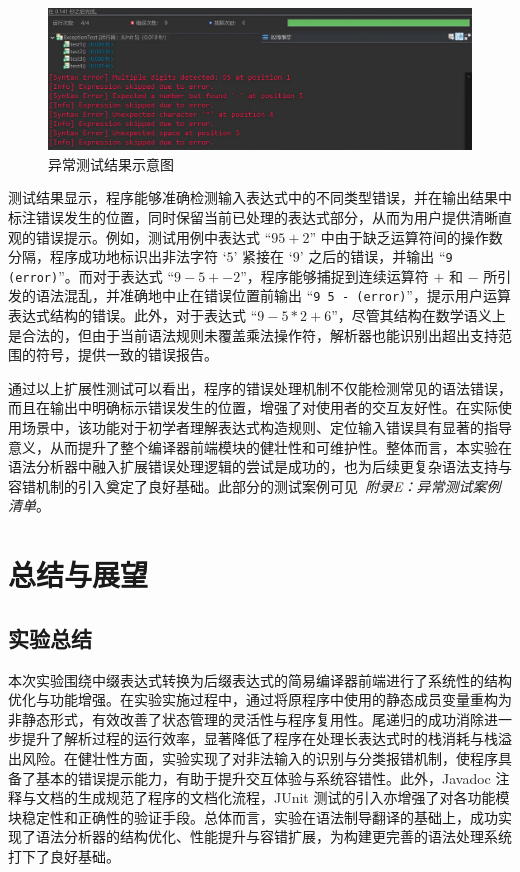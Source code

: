 \documentclass[a4paper, twoside, utf8]{ctexart}
\begin{document}
    \begin{figure}[htbp]
        \centering
        \includegraphics[width=0.8\linewidth]{figure/ExceptionTest.png}
        \caption{异常测试结果示意图}
    \end{figure}

    测试结果显示，程序能够准确检测输入表达式中的不同类型错误，并在输出结果中标注错误发生的位置，同时保留当前已处理的表达式部分，从而为用户提供清晰直观的错误提示。例如，测试用例中表达式 “$95+2$” 中由于缺乏运算符间的操作数分隔，程序成功地标识出非法字符 ‘$5$’ 紧接在 ‘$9$’ 之后的错误，并输出 “\verb|9 (error)|”。而对于表达式 “$9-5+-2$”，程序能够捕捉到连续运算符 $+$ 和 $-$ 所引发的语法混乱，并准确地中止在错误位置前输出 “\verb|9 5 - (error)|”，提示用户运算表达式结构的错误。此外，对于表达式 “$9-5*2+6$”，尽管其结构在数学语义上是合法的，但由于当前语法规则未覆盖乘法操作符，解析器也能识别出超出支持范围的符号，提供一致的错误报告。
    
    通过以上扩展性测试可以看出，程序的错误处理机制不仅能检测常见的语法错误，而且在输出中明确标示错误发生的位置，增强了对使用者的交互友好性。在实际使用场景中，该功能对于初学者理解表达式构造规则、定位输入错误具有显著的指导意义，从而提升了整个编译器前端模块的健壮性和可维护性。整体而言，本实验在语法分析器中融入扩展错误处理逻辑的尝试是成功的，也为后续更复杂语法支持与容错机制的引入奠定了良好基础。此部分的测试案例可见\ \textit{附录E：异常测试案例清单}。

    \section{总结与展望}

    \subsection{实验总结}

    本次实验围绕中缀表达式转换为后缀表达式的简易编译器前端进行了系统性的结构优化与功能增强。在实验实施过程中，通过将原程序中使用的静态成员变量重构为非静态形式，有效改善了状态管理的灵活性与程序复用性。尾递归的成功消除进一步提升了解析过程的运行效率，显著降低了程序在处理长表达式时的栈消耗与栈溢出风险。在健壮性方面，实验实现了对非法输入的识别与分类报错机制，使程序具备了基本的错误提示能力，有助于提升交互体验与系统容错性。此外，Javadoc 注释与文档的生成规范了程序的文档化流程，JUnit 测试的引入亦增强了对各功能模块稳定性和正确性的验证手段。总体而言，实验在语法制导翻译的基础上，成功实现了语法分析器的结构优化、性能提升与容错扩展，为构建更完善的语法处理系统打下了良好基础。
\end{document}
